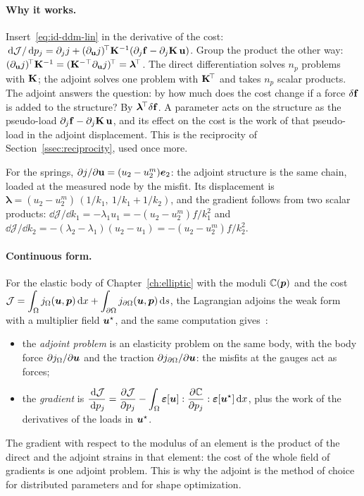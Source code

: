 \paragraph{Why it works.} Insert~\eqref{eq:id-ddm-lin} in the derivative of the
cost: $\,\mathrm{d}\mathcal J/\,\mathrm{d} p_j=\partial_jj+(\partial_{\mathbf{u}}j)^{\!\top}\mathbf{K}^{-1}(\partial_j\mathbf{f}-\partial_j\mathbf{K}\,\mathbf{u})$.
Group the product the other way:
$(\partial_{\mathbf{u}}j)^{\!\top}\mathbf{K}^{-1}=(\mathbf{K}^{-\top}\partial_{\mathbf{u}}j)^{\!\top}=\boldsymbol\lambda^{\!\top}$.
The direct differentiation solves $n_p$ problems with $\mathbf{K}$; the adjoint
solves one problem with $\mathbf{K}^{\!\top}$ and takes $n_p$ scalar products. The adjoint
answers the question: by how much does the cost change if a force $\delta\mathbf{f}$
is added to the structure? By $\boldsymbol\lambda^{\!\top}\delta\mathbf{f}$. A parameter acts on
the structure as the pseudo-load $\partial_j\mathbf{f}-\partial_j\mathbf{K}\,\mathbf{u}$, and
its effect on the cost is the work of that pseudo-load in the adjoint
displacement. This is the reciprocity of Section~\ref{ssec:reciprocity},
used once more.

For the springs, $\partial j/\partial\mathbf{u}=(u_2-u_2^m)\bm{e}_2$: the adjoint
structure is the same chain, loaded at the measured node by the misfit. Its
displacement is $\boldsymbol\lambda=(u_2-u_2^m)\,(1/k_1,\ 1/k_1+1/k_2)$, and the
gradient follows from two scalar products:
$\dd\mathcal J/\dd k_1=-\lambda_1u_1=-(u_2-u_2^m)f/k_1^2$ and
$\dd\mathcal J/\dd k_2=-(\lambda_2-\lambda_1)(u_2-u_1)=-(u_2-u_2^m)f/k_2^2$.

\paragraph{Continuous form.}
%
For the elastic body of Chapter~\ref{ch:elliptic} with the moduli
$\mathbb{C}(\bm{p})$ and the cost
$\displaystyle \mathcal J=\int_\Omega j_\Omega(\bm{u},\bm{p})\,\mathrm{d} x+\int_{\partial\Omega}j_{\partial\Omega}(\bm{u},\bm{p})\,\mathrm{d} s$,
the Lagrangian adjoins the weak form with a multiplier field $\bm{u}^\star$, and
the same computation gives~\cite{BonnetConstantinescu2005}:
\begin{itemize}
  \item the \emph{adjoint problem} is an elasticity problem on the same body,
  with the body force $\partial j_\Omega/\partial\bm{u}$ and the traction
  $\partial j_{\partial\Omega}/\partial\bm{u}$: the misfits at the gauges act as forces;
  \item the \emph{gradient} is
  $\displaystyle \frac{\,\mathrm{d}\mathcal J}{\,\mathrm{d} p_j}=\frac{\partial\mathcal J}{\partial p_j}-\int_\Omega\bm{\varepsilon}[\bm{u}]:\frac{\partial\mathbb{C}}{\partial p_j}:\bm{\varepsilon}[\bm{u}^\star]\,\mathrm{d} x$,
  plus the work of the derivatives of the loads in $\bm{u}^\star$.
\end{itemize}
The gradient with respect to the modulus of an element is the product of the
direct and the adjoint strains in that element: the cost of the whole field of
gradients is one adjoint problem. This is why the adjoint is the method of
choice for distributed parameters and for shape optimization.

